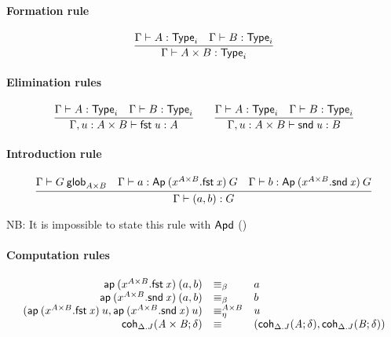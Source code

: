 \paragraph{Formation rule}

\begin{small}
  \[
  \infer{\wftype\Gamma{A\times B}}
  {\wftype\Gamma{A}
    & \wftype\Gamma{B}}
  \]
\end{small}

\paragraph{Elimination rules}

\begin{small}
  \[
  \infer{\ofglob{\Gamma,u:A\times B}{\fst u}{A}}
  {\wftype\Gamma{A}
    & \wftype\Gamma{B}}
  \qquad
  \infer{\ofglob{\Gamma,u:A\times B}{\snd u}{B}}
  {\wftype\Gamma{A}
    & \wftype\Gamma{B}}
  \]
\end{small}

\paragraph{Introduction rule}

\begin{small}
  \[
  \infer{\ofglob{\Gamma}{(a, b)}{G}} {\wfglob{\Gamma}{G}{n}{A\times B} &
    \ofglob{\Gamma}{a}{\Ap{(x^{A\times{}B}.\fst x)}{G}} &
    \ofglob{\Gamma}{b}{\Ap{(x^{A\times{}B}.\snd x)}{G}} }
  \]
\end{small}

NB: It is impossible to state this rule with $\mathsf{Apd}$ ()

\paragraph{Computation rules}

\begin{small}
  \[
  \begin{array}{rll}
    \mathsf{ap} \: {(x^{A\times{}B}.\mathit{\mathsf{fst} \: x})} \: {(a,b)} & \equiv_\beta & a\\
    \mathsf{ap} \: {(x^{A\times{}B}.\mathit{\mathsf{snd} \: x})} \: {(a,b)} & \equiv_\beta & b\\
    (\mathsf{ap} \: {(x^{A\times{}B}.\mathit{\mathsf{fst} \: x})} \: {u}, \mathsf{ap} \: {(x^{A\times{}B}.\mathit{\mathsf{snd} \: x})} \: {u}) & \equiv^{A\times{}B}_\eta & u\\
    \mathsf{coh}_{\Delta.J} \mathit{(A\times B;\delta)} & \equiv &
    (\mathsf{coh}_{\Delta.J} \mathit{(A;\delta)},\mathsf{coh}_{\Delta.J} \mathit{(B;\delta)})
  \end{array}
  \]
\end{small}

